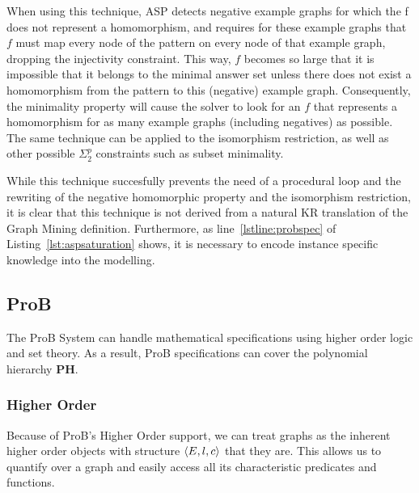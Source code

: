When using this technique, ASP detects negative example graphs for which the f does not represent a homomorphism, and requires for these example graphs that $f$ must map every node of the pattern on every node of that example graph, dropping the injectivity constraint.
This way, $f$ becomes so large that it is impossible that it belongs to the minimal answer set unless there does not exist a homomorphism from the pattern to this (negative) example graph.
Consequently, the minimality property will cause the solver to look for an $f$ that represents a homomorphism for as many example graphs (including negatives) as possible.
The same technique can be applied to the isomorphism restriction, as well as other possible $\Sigma_{2}^{p}$ constraints such as subset minimality.


While this technique succesfully prevents the need of a procedural loop and the rewriting of the negative homomorphic property and the isomorphism restriction, it is clear that this technique is not derived from a natural KR translation of the Graph Mining definition.
Furthermore, as line~\ref{lstline:probspec} of Listing~\ref{lst:aspsaturation} shows, it is necessary to encode instance specific knowledge into the modelling.


\subsection{ProB}
The ProB System can handle mathematical specifications using higher order logic and set theory.
As a result, ProB specifications can cover the polynomial hierarchy \textbf{PH}.

\subsubsection{Higher Order}
Because of ProB's Higher Order support, we can treat graphs as the inherent higher order objects with structure $\langle E,l,c \rangle$ that they are.
This allows us to quantify over a graph and easily access all its characteristic predicates and functions.

